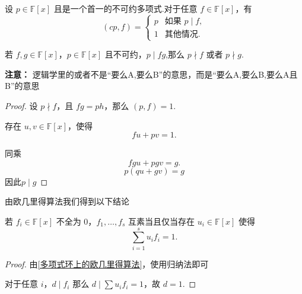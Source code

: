 \begin{proposition}
	设 \( p \in \mathbb{F}[x] \) 且是一个首一的不可约多项式.对于任意 \( f \in \mathbb{F}[x] \)，有
	\[
	(c p, f) =
	\begin{cases}
		p & \text{如果 } p \mid f, \\
		1 & \text{其他情况.}
	\end{cases}
	\]
\end{proposition}
\begin{proposition}
	若 \( f, g \in \mathbb{F}[x] \)，\( p \in \mathbb{F}[x] \) 且不可约，$p\mid fg$,那么 \( p \nmid f \) 或者 \( p \nmid g \).
	

\end{proposition}
\textbf{注意：} 逻辑学里的或者不是“要么A,要么B”的意思，而是“要么A,要么B,要么A且B”的意思
\begin{proof}
	设 \( p \nmid f \)，且 \( fg = p h \)，那么 \( (p, f) = 1 \).
	
	存在 \( u, v \in \mathbb{F}[x] \)，使得
	\[ fu + pv = 1. \]
	
	同乘
	\[ fgu + pgv = g. \]
	\[p(qu+gv)=g\]
	因此$p\mid g$
\end{proof}
由欧几里得算法我们得到以下结论
\begin{corollary}
	若 \( f_i \in \mathbb{F}[x] \) 不全为 0，\( f_1, \ldots, f_s \) 互素当且仅当存在 \( u_i \in \mathbb{F}[x] \) 使得
	\[ \sum_{i=1}^s u_i f_i = 1. \]
\end{corollary}

\begin{proof}
	 由\ref{多项式环上的欧几里得算法}，使用归纳法即可
	
	对于任意 \( i \)，\( d \mid f_i \) 那么 \( d \mid \sum u_i f_i = 1 \)，故 \( d = 1 \).
\end{proof}

